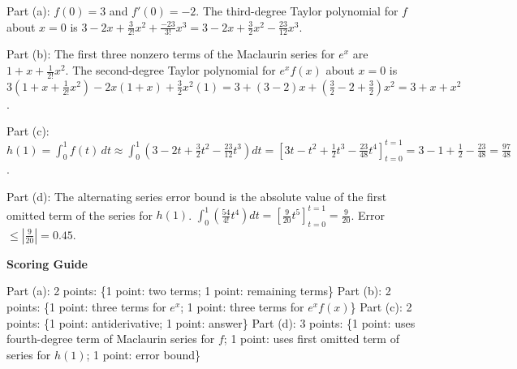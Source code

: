 \documentclass[12pt,addpoints,answers]{exam}
\begin{document}
\begin{questions}
\begin{solution}
Part (a): $f(0) = 3$ and $f'(0) = -2$. The third-degree Taylor polynomial for $f$ about $x = 0$ is $3 - 2x + \frac{3}{2!}x^2 + \frac{-23}{3!}x^3 = 3 - 2x + \frac{3}{2}x^2 - \frac{23}{12}x^3$. \par Part (b): The first three nonzero terms of the Maclaurin series for $e^x$ are $1 + x + \frac{1}{2!}x^2$. The second-degree Taylor polynomial for $e^x f(x)$ about $x = 0$ is $3\left(1 + x + \frac{1}{2!}x^2\right) - 2x(1 + x) + \frac{3}{2}x^2(1) = 3 + (3-2)x + \left(\frac{3}{2} - 2 + \frac{3}{2}\right)x^2 = 3 + x + x^2$. \par Part (c): $h(1) = \int_0^1 f(t)\,dt \approx \int_0^1\left(3 - 2t + \frac{3}{2}t^2 - \frac{23}{12}t^3\right)dt = \left[3t - t^2 + \frac{1}{2}t^3 - \frac{23}{48}t^4\right]_{t=0}^{t=1} = 3 - 1 + \frac{1}{2} - \frac{23}{48} = \frac{97}{48}$. \par Part (d): The alternating series error bound is the absolute value of the first omitted term of the series for $h(1)$. $\int_0^1\left(\frac{54}{4!}t^4\right)dt = \left[\frac{9}{20}t^5\right]_{t=0}^{t=1} = \frac{9}{20}$. Error $\le \left|\frac{9}{20}\right| = 0.45$.
\par\medskip
\textbf{Scoring Guide}\par
Part (a): 2 points: \{1 point: two terms; 1 point: remaining terms\} Part (b): 2 points: \{1 point: three terms for $e^x$; 1 point: three terms for $e^x f(x)$\} Part (c): 2 points: \{1 point: antiderivative; 1 point: answer\} Part (d): 3 points: \{1 point: uses fourth-degree term of Maclaurin series for $f$; 1 point: uses first omitted term of series for $h(1)$; 1 point: error bound\}
\end{solution}
\end{questions}
\end{document}
